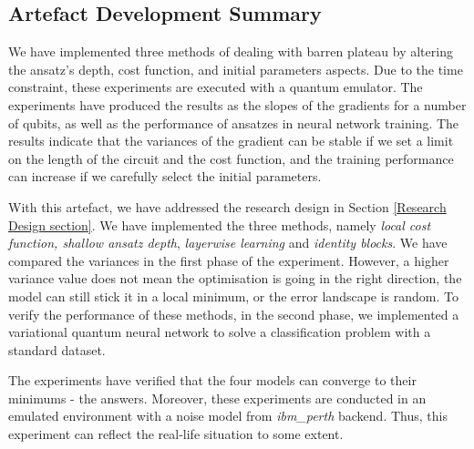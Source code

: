 \subsection{Artefact Development Summary}

We have implemented three methods of dealing with barren plateau by altering the ansatz's depth, cost function, and initial parameters aspects.
Due to the time constraint, these experiments are executed with a quantum emulator.
The experiments have produced the results as the slopes of the gradients for a number of qubits, as well as the performance of ansatzes in neural network training.
The results indicate that the variances of the gradient can be stable if we set a limit on the length of the circuit and the cost function, and the training performance can increase if we carefully select the initial parameters.

With this artefact, we have addressed the research design in Section \ref{Research Design section}.
We have implemented the three methods, namely \textit{local cost function, shallow ansatz depth}, \textit{layerwise learning} and \textit{identity blocks}.
We have compared the variances in the first phase of the experiment.
However, a higher variance value does not mean the optimisation is going in the right direction, the model can still stick it in a local minimum, or the error landscape is random.
To verify the performance of these methods, in the second phase, we implemented a variational quantum neural network to solve a classification problem with a standard dataset.

The experiments have verified that the four models can converge to their minimums - the answers.
Moreover, these experiments are conducted in an emulated environment with a noise model from \emph{ibm\_perth} backend.
Thus, this experiment can reflect the real-life situation to some extent.
